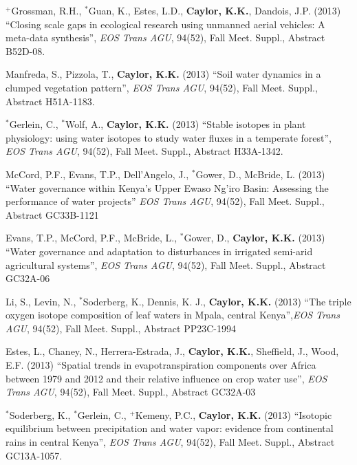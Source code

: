 \documentclass[10pt]{report}
\begin{document}
\begin{etaremune}
\item $^{+}$Grossman, R.H., $^{*}$Guan, K.,  Estes, L.D., \textbf{Caylor, K.K.}, Dandois, J.P. (2013) ``Closing scale gaps in ecological research using unmanned aerial vehicles: A meta-data synthesis'', \emph{EOS Trans AGU}, 94(52), Fall Meet. Suppl., Abstract B52D-08.  

\item Manfreda, S., Pizzola, T., \textbf{Caylor, K.K.} (2013) ``Soil water dynamics in a clumped vegetation pattern'', \emph{EOS Trans AGU}, 94(52), Fall Meet. Suppl., Abstract H51A-1183.

\item $^{*}$Gerlein, C., $^{*}$Wolf, A., \textbf{Caylor, K.K.} (2013) ``Stable isotopes in plant physiology: using water isotopes to study water fluxes in a temperate forest'', \emph{EOS Trans AGU}, 94(52), Fall Meet. Suppl., Abstract H33A-1342.

\item McCord, P.F., Evans, T.P., Dell'Angelo, J., $^{*}$Gower, D., McBride, L. (2013) ``Water governance within Kenya's Upper Ewaso Ng'iro Basin: Assessing the performance of water projects'' \emph{EOS Trans AGU}, 94(52), Fall Meet. Suppl., Abstract GC33B-1121

\item Evans, T.P., McCord, P.F., McBride, L., $^{*}$Gower, D., \textbf{Caylor, K.K.} (2013) ``Water governance and adaptation to disturbances in irrigated semi-arid agricultural systems'', \emph{EOS Trans AGU}, 94(52), Fall Meet. Suppl., Abstract GC32A-06

\item Li, S., Levin, N., $^{*}$Soderberg, K., Dennis, K. J., \textbf{Caylor, K.K.} (2013) ``The triple oxygen isotope composition of leaf waters in Mpala, central Kenya'',\emph{EOS Trans AGU}, 94(52), Fall Meet. Suppl., Abstract PP23C-1994

\item Estes, L., Chaney, N., Herrera-Estrada, J., \textbf{Caylor, K.K.}, Sheffield, J., Wood, E.F. (2013) ``Spatial trends in evapotranspiration components over Africa between 1979 and 2012 and their relative influence on crop water use'', \emph{EOS Trans AGU}, 94(52), Fall Meet. Suppl., Abstract GC32A-03

\item $^{*}$Soderberg, K., $^{*}$Gerlein, C., $^{+}$Kemeny, P.C., \textbf{Caylor, K.K.} (2013) ``Isotopic equilibrium between precipitation and water vapor: evidence from continental rains in central Kenya'', \emph{EOS Trans AGU}, 94(52), Fall Meet. Suppl., Abstract GC13A-1057.


\end{etaremune}
\end{document}
